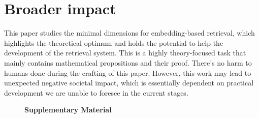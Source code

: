 \documentclass{article}
\begin{document}
\printAffiliationsAndNotice{}  %

\begin{abstract}
This paper studies the minimal dimension required to embed subset memberships ($m$ elements and ${m\choose k}$ subsets of at most $k$ elements) into vector spaces, denoted as Minimal Embeddable Dimension (MED).
The tight bounds of MED are derived theoretically and supported empirically for various notions of ``distances'' or ``similarities'', including $\ell_2$ metric, inner product, and cosine similarity.
In addition, we conduct numerical simulation in a more achievable setting, where the ${m\choose k}$ subset embeddings are chosen as the centroid of the embeddings of the contained elements. Our simulation easily realizes a logarithmic dependency between the MED and the number of elements to embed.
These findings imply that embedding-based retrieval limitations stem primarily from learnability challenges, not geometric constraints, guiding future algorithm design.
\end{abstract}








\section{Broader impact}

This paper studies the minimal dimensions for embedding-based retrieval, which highlights the theoretical optimum and holds the potential to help the development of the retrieval system. This is a highly theory-focused task that mainly contains mathematical propositions and their proof. There's no harm to humans done during the crafting of this paper. However, this work may lead to unexpected negative societal impact, which is essentially dependent on practical development we are unable to foresee in the current stages.




\newpage
\appendix
\onecolumn
\clearpage
\begin{figure}[t!]
\huge
\begin{center}
    \textbf{Supplementary Material}
\end{center}
\end{figure}



\end{document}
